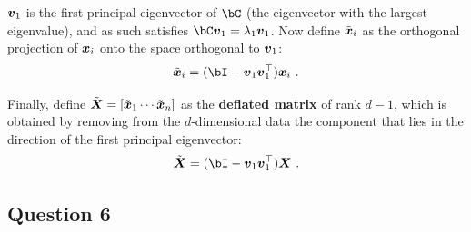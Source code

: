 \documentclass{article}
\begin{document}
$\boldsymbol{v}_1$ is the first principal eigenvector of $\bC$ (the eigenvector with the largest eigenvalue), and as such satisfies $\bC \bv_1 = \lambda_1 \bv_1$. Now define $\tilde {\boldsymbol{x}}_i$ as the orthogonal projection of $\boldsymbol{x}_i$ onto the space orthogonal to $\boldsymbol{v}_1$:
\[
\tilde \bx_i = (\bI - \bv_1 \bv_1^\top) \bx_i~.
\]

Finally, define $\tilde {\boldsymbol{X}} = [\tilde {\boldsymbol{x}}_1  \cdots  \tilde {\boldsymbol{x}}_n]$ as the \textbf{deflated matrix} of rank  $d-1$, which is obtained by removing from the $d$-dimensional data the component that lies in the direction of the first principal eigenvector:
\[
\tilde \bX = (\bI - \bv_1 \bv_1^\top) \bX~.
\]

\subsection{Question 6}
\end{document}
